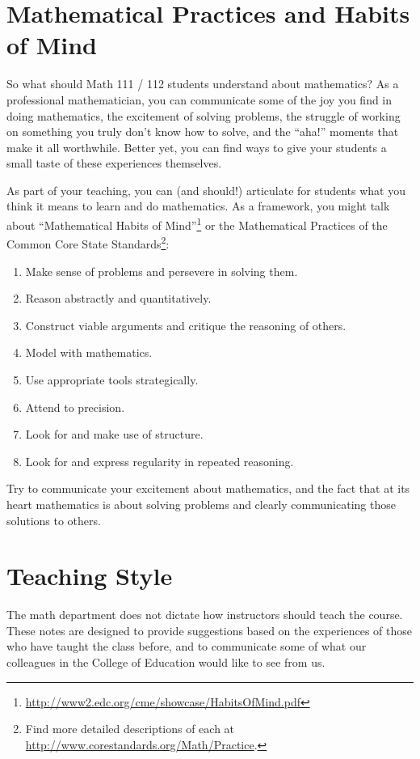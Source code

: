 \documentclass[12pt, reqno]{amsart}
\theoremstyle{remark}
\theoremstyle{definition}
\numberwithin{equation}{section}  %
\begin{document}
\section{Mathematical Practices and Habits of Mind}\label{sec:MPs}
So what should Math 111 / 112 students understand about mathematics?  As a professional mathematician, you can communicate some of the joy you find in doing mathematics, the excitement of solving problems, the struggle of working on something you truly don't know how to solve, and the ``aha!'' moments that make it all worthwhile.  Better yet, you can find ways to give your students a small taste of these experiences themselves.

As part of your teaching, you can (and should!) articulate for students what you think it means to learn and do mathematics.  As a framework, you might talk about ``Mathematical Habits of Mind''\footnote{\url{http://www2.edc.org/cme/showcase/HabitsOfMind.pdf}} or the Mathematical Practices of the Common Core State Standards\footnote{Find more detailed descriptions of each at  \url{http://www.corestandards.org/Math/Practice}.}:
\begin{enumerate}
\item
Make sense of problems and persevere in solving them.
\item
Reason abstractly and quantitatively.
\item
Construct viable arguments and critique the reasoning of others.
\item
Model with mathematics.
\item
Use appropriate tools strategically.
\item
Attend to precision.
\item
Look for and make use of structure.
\item
Look for and express regularity in repeated reasoning.
\end{enumerate}


Try to  communicate your excitement about mathematics, and the fact that at its heart mathematics is about solving problems and clearly communicating those solutions to others.


\section{Teaching Style} 
The math department does not dictate how instructors should teach the course.  These  notes are designed to provide suggestions based on the experiences of those who have taught the class before, and to communicate some of what our colleagues in the College of Education would like to see from us.  
\end{document}

